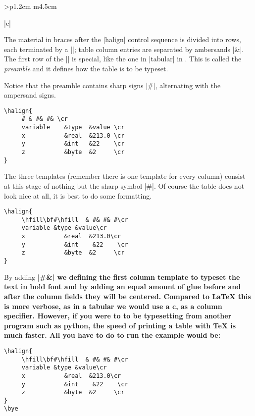 \begin{tabular}{>{\bfseries}p{1.2cm} m{4.5cm}}
\begin{tabular}[t]{|c|}
\begin{longtable}
The material in braces after the |halign| control sequence is divided into rows, each terminated by a |\cr|; table column entries are separated by ambersands |&|. The first row of the |\halign| is special, like the one in |tabular| in \latex.
This is called the \emph{preamble} and it defines how the table is to be typeset. 

Notice that the preamble contains sharp signs |#|, alternating with the ampersand signs.

\begin{scriptexample}{}{}
\begin{verbatim}
\halign{
     # & #& #& \cr
     variable    &type  &value \cr
     x           &real  &213.0 \cr 
     y           &int   &22    \cr
     z           &byte  &2     \cr
}
\end{verbatim}
\end{scriptexample}

The three templates (remember there is one template for every column) consist at this stage of nothing but the sharp symbol |#|. Of course the table does not look nice at all, it is best to do some formatting.

\begin{scriptexample}{}{}
\begin{verbatim}
\halign{
     \hfill\bf#\hfill  & #& #& #\cr
     variable &type &value\cr
     x           &real  &213.0\cr 
     y           &int    &22    \cr
     z           &byte  &2     \cr
}
\end{verbatim}
\end{scriptexample}

By adding |\hfil\bf#\hfill &| we defining the first column template to typeset the text in bold font and by adding an equal amount of glue before and after the column fields they will be centered. Compared to LaTeX this is more verbose, as in a tabular we would use a \textbf{c}, as a column specifier. However, if you were to to be typesetting from another program such as python, the speed of printing a table with TeX is much faster. All you have to do to run the example would be:

\begin{verbatim}
\halign{
     \hfill\bf#\hfill  & #& #& #\cr
     variable &type &value\cr
     x           &real  &213.0\cr 
     y           &int    &22    \cr
     z           &byte  &2     \cr
}
\bye
\end{verbatim}


\end{longtable}
\end{tabular}
\end{tabular}
